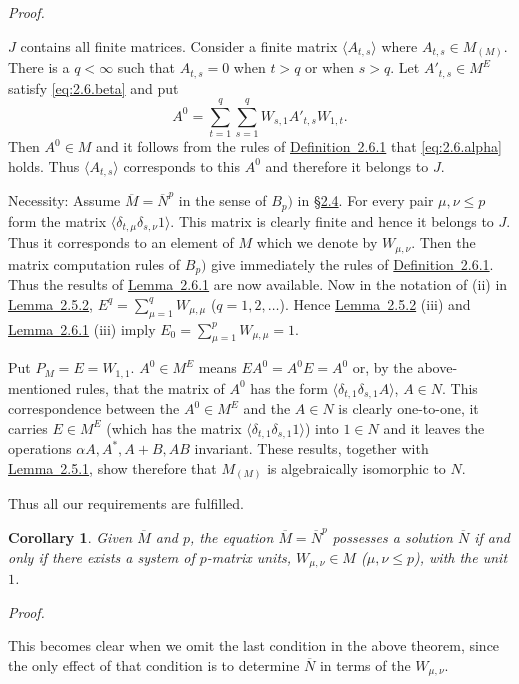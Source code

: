 \documentclass[b5paper,twoside]{article}
\newcommand{\secref}[2]{\hyperref[#1]{\mbox{\S#2}}}
\newcommand{\lemref}[2]{\hyperref[#1]{\mbox{Lemma~#2}}}
\newcommand{\defref}[2]{\hyperref[#1]{\mbox{Definition~#2}}}
\theoremstyle{mvnplain}
\newtheorem*{corollary}{Corollary}
\renewenvironment{proof}[1][Proof]{%
  \par\addvspace{0.35\baselineskip}%
  \noindent\textit{#1.}\ \normalfont\ignorespaces
}{%
  \par\addvspace{0.35\baselineskip}%
}
\newcommand{\M}{\mathbf M}
\newcommand{\N}{\mathbf N}
\def\M{M}%
\def\N{N}%
\def\mathfrak#1{#1}%
\begin{document}
\begin{proof}
$\mathfrak J$ contains all finite matrices.  Consider a finite matrix
$\langle A_{t,s}\rangle$ where $A_{t,s}\in\M_{(\mathfrak M)}$.  There is
a $q<\infty$ such that $A_{t,s}=0$ when $t>q$ or when $s>q$.  Let
$A'_{t,s}\in\M^{E}$ satisfy \eqref{eq:2.6.beta} and put
\[
  A^{0}=\sum_{t=1}^{q}\sum_{s=1}^{q}W_{s,1}A'_{t,s}W_{1,t}.
\]
Then $A^{0}\in\M$ and it follows from the rules of
\defref{def:2.6.1}{2.6.1} that \eqref{eq:2.6.alpha} holds.  Thus
$\langle A_{t,s}\rangle$ corresponds to this $A^{0}$ and therefore it
belongs to $\mathfrak J$.

Necessity: Assume $\overline{\M}=\overline{\N}^{p}$ in the sense of $B_p)$
in \secref{sec:2.4}{2.4}.  For every pair $\mu,\nu\leq p$ form the matrix
$\langle\delta_{t,\mu}\delta_{s,\nu}1\rangle$.  This matrix is clearly
finite and hence it belongs to $\mathfrak J$.  Thus it corresponds to an
element of $\M$ which we denote by $W_{\mu,\nu}$.  Then the matrix
computation rules of $B_p)$ give immediately the rules of
\defref{def:2.6.1}{2.6.1}.  Thus the results of
\lemref{lem:2.6.1}{2.6.1} are now available.  Now in the notation of (ii) in
\lemref{lem:2.5.2}{2.5.2},
$E^q=\sum_{\mu=1}^{q}W_{\mu,\mu}$ ($q=1,2,\ldots$).  Hence
\lemref{lem:2.5.2}{2.5.2} (iii) and \lemref{lem:2.6.1}{2.6.1} (iii) imply
$E_0=\sum_{\mu=1}^{p}W_{\mu,\mu}=1$.

Put $P_{\mathfrak M}=E=W_{1,1}$.  $A^{0}\in\M^{E}$ means
$EA^{0}=A^{0}E=A^{0}$ or, by the above-mentioned rules, that the matrix of
$A^{0}$ has the form
$\langle\delta_{t,1}\delta_{s,1}A\rangle$, $A\in\N$.  This correspondence
between the $A^{0}\in\M^{E}$ and the $A\in\N$ is clearly one-to-one, it
carries $E\in\M^{E}$ (which has the matrix
$\langle\delta_{t,1}\delta_{s,1}1\rangle$) into $1\in\N$ and it leaves the
operations $\alpha A,A^{*},A+B,AB$ invariant.  These results, together with
\lemref{lem:2.5.1}{2.5.1}, show therefore that
$\M_{(\mathfrak M)}$ is algebraically isomorphic to $\N$.

Thus all our requirements are fulfilled.
\end{proof}

\begin{corollary}\label{cor:2.6.1}
Given $\overline{\M}$ and $p$, the equation
$\overline{\M}=\overline{\N}^{p}$ possesses a solution $\overline{\N}$ if
and only if there exists a system of $p$-matrix units,
$W_{\mu,\nu}\in\M$ ($\mu,\nu\leq p$), with the unit $1$.
\end{corollary}
\begin{proof}
This becomes clear when we omit the last condition in the above theorem,
since the only effect of that condition is to determine $\overline{\N}$ in
terms of the $W_{\mu,\nu}$.
\end{proof}
\end{document}
